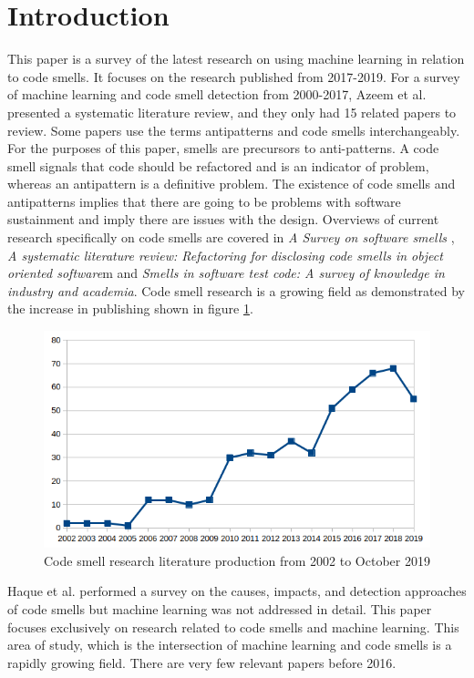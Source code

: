 \documentclass[conference]{IEEEtran}
\begin{document}
\section{Introduction}
This paper is a survey of the latest research on using machine learning in relation to code smells. It focuses on the research published from 2017-2019. For a survey of machine learning and code smell detection from 2000-2017, Azeem et al. presented a systematic literature review\cite{azeem_machine_2019}, and they only had 15 related papers to review. 
Some papers use the terms antipatterns and code smells interchangeably\cite{singh_systematic_2018}. 
For the purposes of this paper, smells are precursors to anti-patterns. 
A code smell signals that code should be refactored and is an indicator of problem, whereas an antipattern is a definitive problem. 
The existence of code smells and antipatterns implies that there are going to be problems with software sustainment and imply there are issues with the design.
Overviews of current research specifically on code smells are covered in \textit{A Survey on software smells} \cite{sharma_survey_2018}, \textit{A systematic literature review: Refactoring for disclosing code smells in object oriented software}\cite{singh_systematic_2018}m and \textit{Smells in software test code: A survey of knowledge in industry and
academia}\cite{garousi_smells_2018}. 
Code smell research is a growing field\cite{kokol_code_2018} as demonstrated by the increase in publishing shown in figure \ref{fig:smellresearch}.
\begin{figure}[!ht]
  \centerline{\includegraphics[width=\textwidth]{graph2.png}}
  \caption{Code smell research literature production from 2002 to October 2019\cite{kokol_code_2018}}
  \label{fig:smellresearch}
\end{figure} 
Haque et al.\cite{haque_causes_2018} performed a survey on the causes, impacts, and detection approaches of code smells but machine learning was not addressed in detail. 
This paper focuses exclusively on research related to code smells and machine learning.
This area of study, which is the intersection of machine learning and code smells is a rapidly growing field. There are very few relevant papers before 2016.
\end{document}
